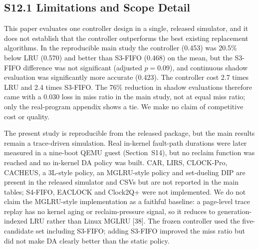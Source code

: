 \documentclass[journal,onecolumn]{IEEEtran}
\begin{document}
\subsection*{S12.1 Limitations and Scope Detail}
This paper evaluates one controller design in a single, released simulator,
and it does not establish that the controller outperforms the best existing
replacement algorithms. In the reproducible main study the controller (0.453)
was 20.5\% below LRU (0.570) and better than S3-FIFO (0.468) on the mean, but
the S3-FIFO difference was not significant (adjusted $p = 0.09$), and
continuous shadow evaluation was significantly more accurate (0.423). The
controller cost 2.7 times LRU and 2.4 times S3-FIFO. The 76\% reduction in
shadow evaluations therefore came with a 0.030 loss in miss ratio in the main
study, not at equal miss ratio; only the real-program appendix shows a tie. We
make no claim of competitive cost or quality.

The present study is reproducible from the released package, but the main
results remain a trace-driven simulation. Real in-kernel fault-path durations
were later measured in a nine-boot QEMU guest (Section~S14), but no reclaim
function was reached and no in-kernel DA policy was built. CAR,
LIRS, CLOCK-Pro, CACHEUS, a 3L-style policy, an MGLRU-style policy and
set-dueling DIP are present in the released simulator and CSVs but are not
reported in the main tables; S4-FIFO, EACLOCK and Clock2Q+ were not implemented.
We do not claim the MGLRU-style implementation as a faithful baseline: a
page-level trace replay has no kernel aging or reclaim-pressure signal, so it
reduces to generation-indexed LRU rather than Linux MGLRU [38]. The frozen
controller used the five-candidate set including S3-FIFO; adding S3-FIFO
improved the miss ratio but did not make DA clearly better than the static
policy.
\end{document}
